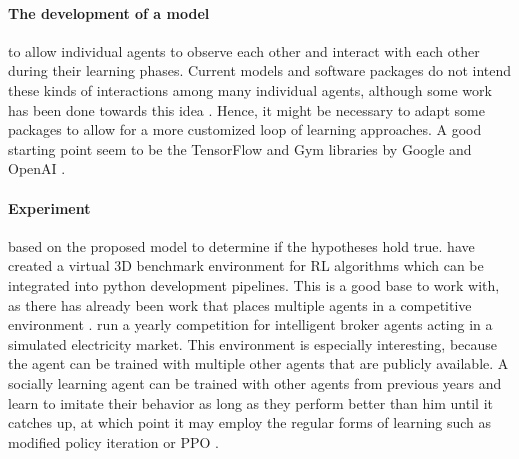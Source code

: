 \documentclass[12pt,a4paper]{article}
\begin{document}

\paragraph{The development of a model}
to allow individual agents to observe each other and interact with each other during their learning phases. Current models and software packages do not intend these kinds of interactions among many individual agents, although some work has been done towards this idea \cite{duan2017one}. Hence, it might be necessary to adapt some packages to allow for a more customized loop of learning approaches. A good starting point seem to be the TensorFlow and Gym libraries by Google and OpenAI \cite{tensorflow2015-whitepaper,openaigym}.

\paragraph{Experiment}
 based on the proposed model to determine if the hypotheses hold true.
\citeauthor{openaigym} have created a virtual 3D benchmark environment for \ac{RL} algorithms which can be integrated into python development pipelines. This is a good base to work with, as there has already been work that places multiple agents in a competitive environment \cite{bansal2017emergent}.
\citeauthor{ketter2016powertac} run a yearly competition for intelligent broker agents acting in a simulated electricity market. This environment is especially interesting, because the agent can be trained with multiple other agents that are publicly available. A socially learning agent can be trained with other agents from previous years and learn to imitate their behavior as long as they perform better than him until it catches up, at which point it may employ the regular forms of learning such as modified policy iteration \cite[p.657]{russell2016artificial} or \ac{PPO} \cite{proximalpolicyopt}.


\end{document}
